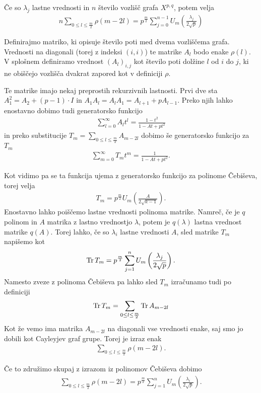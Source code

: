\begin{izrek}
    Če so \(\lambda_j\) lastne vrednosti in \(n\) število vozlišč grafa \(X^{p,q}\), potem velja
    \begin{align*}
        n\sum_{0\leq l \leq \frac{m}{2}} \rho(m-2l) = p^{\frac{m}{2}}\sum_{j=0}^{n-1} U_m \left(\frac{\lambda_j}{2\sqrt{p}}\right)
    \end{align*}
\end{izrek}
\begin{dokaz}
    Definirajmo matriko, ki opisuje število poti med dvema vozliščema grafa. Vrednosti na diagonali (torej z indeksi \((i, i)\)) te matrike \(A_l\) bodo enake \(\rho(l)\). V splošnem definiramo vrednost \((A_l)_{i,j}\) kot število poti dolžine \(l\) od \(i\) do \(j\), ki ne obiščejo vozlišča dvakrat zapored kot v definiciji \(\rho\).

    Te matrike imajo nekaj preprostih rekurzivnih lastnosti. Prvi dve sta \(A_1^2 = A_2 + (p-1)\cdot I\) in \(A_1 A_l = A_lA_1 = A_{l+1}+pA_{l-1}\). Preko njih lahko enostavno dobimo tudi generatorsko funkcijo
    \begin{align*}
        \sum_{l=0}^\infty A_lt^l = \frac{1-t^2}{1-At+pt^2}
    \end{align*}
    in preko substitucije \(T_m = \sum_{0\leq l \leq \frac{m}{2}} A_{m-2l}\) dobimo še generatorsko funkcijo za \(T_m\)
    \begin{align*}
        \sum_{m=0}^\infty T_m t^m = \frac{1}{1-At+pt^2}.
    \end{align*}

    Kot vidimo pa se ta funkcija ujema z generatorsko funkcijo za polinome Čebiševa, torej velja
    \begin{align*}
        T_m = p^{\frac{m}{2}} U_m\left(\frac{A}{2\sqrt{k-1}}\right).
    \end{align*}
    Enostavno lahko poiščemo lastne vrednosti polinoma matrike. Namreč, če je \(q\) polinom in \(A\) matrika z lastno vrednostjo \(\lambda\), potem je \(q(\lambda)\) lastna vrednost matrike \(q(A)\). Torej lahko, če so \(\lambda_i\) lastne vrednosti \(A\), sled matrike \(T_m\) napišemo kot
    \begin{align*}
        \operatorname{Tr} T_m = p^{\frac{m}{2}}\sum_{j=1}^n U_m \left(\frac{\lambda_j}{2\sqrt{p}}\right).
    \end{align*}
    Namesto zveze z polinoma Čebiševa pa lahko sled \(T_m\) izračunamo tudi po definiciji
    \begin{align*}
        \operatorname{Tr} T_m = \sum_{0\leq l\leq \frac{m}{2}} \operatorname{Tr} A_{m-2l}
    \end{align*}
    Kot že vemo ima matrika \(A_{m-2l}\) na diagonali vse vrednosti enake, saj smo jo dobili kot Cayleyjev graf grupe. Torej je izraz enak
    \begin{align*}
        \sum_{0\leq l\leq \frac{m}{2}} \rho(m-2l).
    \end{align*}

    Če to združimo skupaj z izrazom iz polinomov Čebiševa dobimo
    \begin{align*}
        \sum_{0\leq l\leq \frac{m}{2}} \rho(m-2l) = p^{\frac{m}{2}}\sum_{j=1}^n U_m \left(\frac{\lambda_i}{2\sqrt{p}}\right).
    \end{align*}
\end{dokaz}

